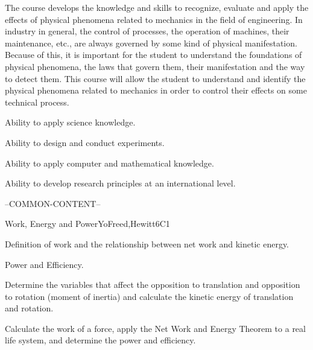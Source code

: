 \begin{syllabus}


\begin{justification}
   The course develops the knowledge and skills to recognize, evaluate and apply the effects of physical phenomena related to mechanics in the field of engineering. In industry in general, the control of processes, the operation of machines, their maintenance, etc., are always governed by some kind of physical manifestation. Because of this, it is important for the student to understand the foundations of physical phenomena, the laws that govern them, their manifestation and the way to detect them. This course will allow the student to understand and identify the physical phenomena related to mechanics in order to control their effects on some technical process. 
\end{justification}

\begin{goals}
\item Ability to apply science knowledge.
\item Ability to design and conduct experiments.
\item Ability to apply computer and mathematical knowledge.
\item Ability to develop research principles at an international level.
\end{goals}

--COMMON-CONTENT--

\begin{unit}{Work, Energy and Power}{}{YoFreed,Hewitt}{6}{C1}
   \begin{topics}
      \item Definition of work and the relationship between net work and kinetic energy.
      \item Power and Efficiency.
   \end{topics}
   
   \begin{learningoutcomes}
      \item Determine the variables that affect the opposition to translation and opposition to rotation (moment of inertia) and calculate the kinetic energy of translation and rotation.
      \item Calculate the work of a force, apply the Net Work and Energy Theorem to a real life system, and determine the power and efficiency.
   \end{learningoutcomes}
\end{unit}
   

\end{syllabus}
